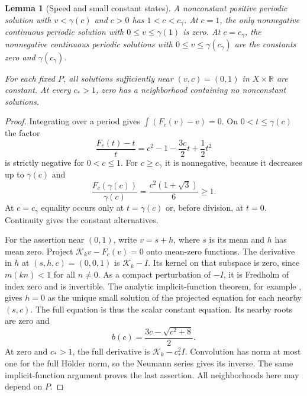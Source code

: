 \documentclass[11pt,a4paper]{article}
\newtheorem{lemma}[theorem]{Lemma}
\theoremstyle{remark}
\newcommand{\R}{\mathbb R}
\newcommand{\K}{\mathcal K}
\newcommand{\cg}{c_\gamma}
\begin{document}
\begin{lemma}[Speed and small constant states]\label{lem:speed}
A nonconstant positive periodic solution with $v<\gamma(c)$ and $c>0$
has $1<c<\cg$. At $c=1$, the only nonnegative continuous periodic solution
with $0\le v\le\gamma(1)$ is zero. At $c=\cg$, the nonnegative continuous
periodic solutions with $0\le v\le\gamma(\cg)$ are the constants zero and
$\gamma(\cg)$.

For each fixed $P$, all solutions sufficiently near $(v,c)=(0,1)$ in
$X\times\R$ are constant. At every $c_*>1$, zero has a neighborhood
containing no nonconstant solutions.
\end{lemma}
\begin{proof}
Integrating over a period gives $\int(F_c(v)-v)=0$. On
$0<t\le\gamma(c)$ the factor
\[
 \frac{F_c(t)-t}{t}=c^2-1-\frac{3c}{2}t+\frac12t^2
\]
is strictly negative for $0<c\le1$. For $c\ge\cg$ it is nonnegative,
because it decreases up to $\gamma(c)$ and
\begin{equation}\label{eq:upper-speed}
 \frac{F_c(\gamma(c))}{\gamma(c)}=\frac{c^2(1+\sqrt3)}6\ge1.
\end{equation}
At $c=\cg$ equality occurs only at $t=\gamma(c)$ or, before division,
at $t=0$. Continuity gives the constant alternatives.

For the assertion near $(0,1)$, write $v=s+h$, where $s$ is its mean and
$h$ has mean zero. Project $\K_kv-F_c(v)=0$ onto mean-zero functions.
The derivative in $h$ at $(s,h,c)=(0,0,1)$ is $\K_k-I$. Its kernel on
that subspace is zero, since $m(kn)<1$ for all $n\ne0$. As a compact
perturbation of $-I$, it is Fredholm of index zero and is invertible.
The analytic implicit-function theorem, for example
\cite[Lemma 3R]{FNSS}, gives $h=0$ as the unique small solution of the
projected equation for each nearby $(s,c)$. The full equation is thus the
scalar constant equation. Its nearby roots are zero and
\begin{equation}\label{eq:constant-branch}
 b(c)=\frac{3c-\sqrt{c^2+8}}2.
\end{equation}
At zero and $c_*>1$, the full derivative is $\K_k-c_*^2I$.
Convolution has norm at most one for the full H\"older norm, so the
Neumann series gives its inverse. The same implicit-function argument
proves the last assertion. All neighborhoods here may depend on $P$.
\end{proof}
\end{document}
